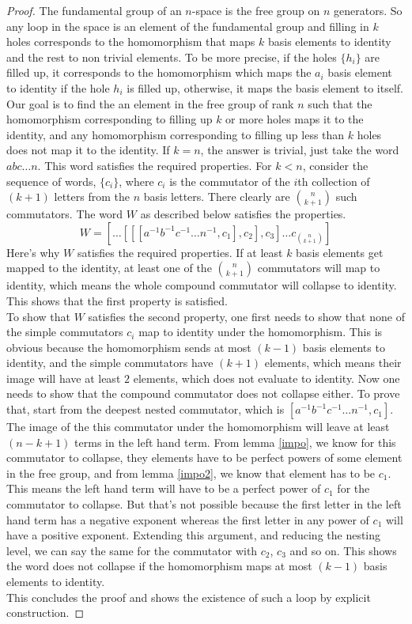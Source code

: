 \documentclass[12pt, titlepage]{article}
\theoremstyle{definition}
\begin{document}
\begin{proof}
The fundamental group of an $n$-space is the free group on $n$ generators. So any loop in the space is an element of the fundamental group and filling in $k$ holes corresponds to the homomorphism that maps $k$ basis elements to identity and the rest to non trivial elements. To be more precise, if the holes $\{h_i\}$ are filled up, it corresponds to the homomorphism which maps the $a_i$ basis element to identity if the hole $h_i$ is filled up, otherwise, it maps the basis element to itself. Our goal is to find the an element in the free group of rank $n$ such that the homomorphism corresponding to filling up $k$ or more holes maps it to the identity, and any homomorphism corresponding to filling up less than $k$ holes does not map it to the identity.
If $k=n$, the answer is trivial, just take the word $abc\ldots n$. This word satisfies the required properties. For $k<n$, consider the sequence of words, $\{c_i\}$, where $c_i$ is the commutator of the $i$th collection of $(k+1)$ letters from the $n$ basis letters. There clearly are $n \choose {k+1}$ such commutators. The word $W$ as described below satisfies the properties.
$$W = \left[ \ldots [[[a^{-1}b^{-1}c^{-1}\ldots n^{-1}, c_1], c_2], c_3] \ldots c_{n \choose{k+1}}\right]$$
Here's why $W$ satisfies the required properties. If at least $k$ basis elements get mapped to the identity, at least one of the $n \choose{k+1}$ commutators will map to identity, which means the whole compound commutator will collapse to identity. This shows that the first property is satisfied.\\
To show that $W$ satisfies the second property, one first needs to show that none of the simple commutators $c_i$ map to identity under the homomorphism. This is obvious because the homomorphism sends at most $(k-1)$ basis elements to identity, and the simple commutators have $(k+1)$ elements, which means their image will have at least $2$ elements, which does not evaluate to identity. Now one needs to show that the compound commutator does not collapse either. To prove that, start from the deepest nested commutator, which is $[a^{-1}b^{-1}c^{-1}\ldots n^{-1}, c_1]$. The image of the this commutator under the homomorphism will leave at least $(n-k+1)$ terms in the left hand term. From lemma \autoref{impo}, we know for this commutator to collapse, they elements have to be perfect powers of some element in the free group, and from lemma \autoref{impo2}, we know that element has to be $c_1$. This means the left hand term will have to be a perfect power of $c_1$ for the commutator to collapse. But that's not possible because the first letter in the left hand term has a negative exponent whereas the first letter in any power of $c_1$ will have a positive exponent. Extending this argument, and reducing the nesting level, we can say the same for the commutator with $c_2$, $c_3$ and so on. This shows the word does not collapse if the homomorphism maps at most $(k-1)$ basis elements to identity.\\
This concludes the proof and shows the existence of such a loop by explicit construction.
\end{proof}
\end{document}
